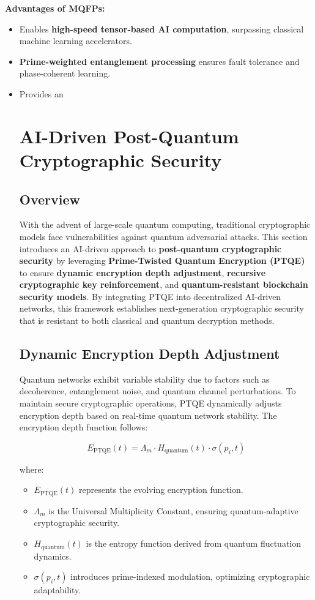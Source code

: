 \documentclass{article}
\theoremstyle{plain}
\begin{document}
\noindent \textbf{Advantages of MQFPs:}
\begin{itemize}
    \item Enables \textbf{high-speed tensor-based AI computation}, surpassing classical machine learning accelerators.
    \item \textbf{Prime-weighted entanglement processing} ensures fault tolerance and phase-coherent learning.
    \item Provides an \textb


\section{AI-Driven Post-Quantum Cryptographic Security}

\subsection{Overview}

With the advent of large-scale quantum computing, traditional cryptographic models face vulnerabilities against quantum adversarial attacks. This section introduces an AI-driven approach to \textbf{post-quantum cryptographic security} by leveraging \textbf{Prime-Twisted Quantum Encryption (PTQE)} to ensure \textbf{dynamic encryption depth adjustment}, \textbf{recursive cryptographic key reinforcement}, and \textbf{quantum-resistant blockchain security models}. By integrating PTQE into decentralized AI-driven networks, this framework establishes next-generation cryptographic security that is resistant to both classical and quantum decryption methods.

\subsection{Dynamic Encryption Depth Adjustment}

Quantum networks exhibit variable stability due to factors such as decoherence, entanglement noise, and quantum channel perturbations. To maintain secure cryptographic operations, PTQE dynamically adjusts encryption depth based on real-time quantum network stability. The encryption depth function follows:

\begin{equation}
    E_{\text{PTQE}}(t) = \Lambda_m \cdot H_{\text{quantum}}(t) \cdot \sigma(p_i, t)
\end{equation}

where:
\begin{itemize}
    \item \( E_{\text{PTQE}}(t) \) represents the evolving encryption function.
    \item \( \Lambda_m \) is the Universal Multiplicity Constant, ensuring quantum-adaptive cryptographic security.
    \item \( H_{\text{quantum}}(t) \) is the entropy function derived from quantum fluctuation dynamics.
    \item \( \sigma(p_i, t) \) introduces prime-indexed modulation, optimizing cryptographic adaptability.
\end{itemize}


\end{itemize}
\end{document}
